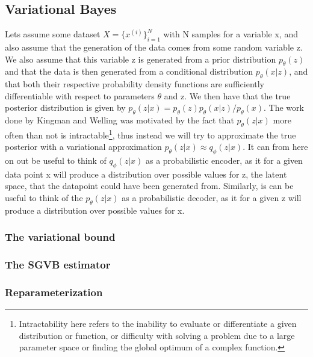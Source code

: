 \subsection*{Variational Bayes}
Lets assume some dataset $X = \{x^{(i)}\}_{i=1}^{N}$ with N samples for a variable x, and also assume that the generation of the data comes from 
some random variable z. We also assume that this variable z is generated from a prior distribution $p_{\theta}(z)$ and that the data is then 
generated from a conditional distribution $p_{\theta}(x|z)$, and that both their respective probability density functions are sufficiently 
differentiable with respect to parameters $\theta$ and z. We then have that the true posterior distribution is given by 
$p_{\theta}(z|x) = p_{\theta}(z)p_{\theta}(x|z)/p_{\theta}(x)$. The work done by Kingman and Welling \cite{VAE} was motivated by the fact that
$p_{\theta}(z|x)$ more often than not is intractable\footnote{Intractability here refers to the inability to evaluate or differentiate 
a given distribution or function, or difficulty with solving a problem due to a large parameter space or finding the global optimum of 
a complex function. }, thus instead we will try to approximate the true posterior with a variational approximation $p_{\theta}(z|x) \approx q_{\phi}(z|x)$.   
It can from here on out be useful to think of $q_{\phi}(z|x)$ as a probabilistic encoder, as it for a given data point x will produce a distribution
over possible values for z, the latent space, that the datapoint could have been generated from. Similarly, is can be useful to think of the   
$p_{\theta}(z|x)$ as a probabilistic decoder, as it for a given z will produce a distribution over possible values for x.

\subsubsection*{The variational bound}

\subsubsection*{The SGVB estimator}

\subsubsection*{Reparameterization}


